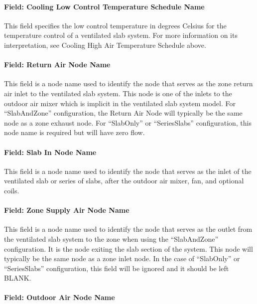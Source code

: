 \paragraph{Field: Cooling Low Control Temperature Schedule Name}\label{field-cooling-low-control-temperature-schedule-name-1}

This field specifies the low control temperature in degrees Celsius for the temperature control of a ventilated slab system. For more information on its interpretation, see Cooling High Air Temperature Schedule above.

\paragraph{Field: Return Air Node Name}\label{field-return-air-node-name-000}

This field is a node name used to identify the node that serves as the zone return air inlet to the ventilated slab system. This node is one of the inlets to the outdoor air mixer which is implicit in the ventilated slab system model. For ``SlabAndZone'' configuration, the Return Air Node will typically be the same node as a zone exhaust node. For ``SlabOnly'' or ``SeriesSlabs'' configuration, this node name is required but will have zero flow.

\paragraph{Field: Slab In Node Name}\label{field-slab-in-node-name}

This field is a node name used to identify the node that serves as the inlet of the ventilated slab or series of slabs, after the outdoor air mixer, fan, and optional coils.

\paragraph{Field: Zone Supply Air Node Name}\label{field-zone-supply-air-node-name-000}

This field is a node name used to identify the node that serves as the outlet from the ventilated slab system to the zone when using the ``SlabAndZone'' configuration. It is the node exiting the slab section of the system. This node will typically be the same node as a zone inlet node. In the case of ``SlabOnly'' or ``SeriesSlabs'' configuration, this field will be ignored and it should be left BLANK.

\paragraph{Field: Outdoor Air Node Name}


